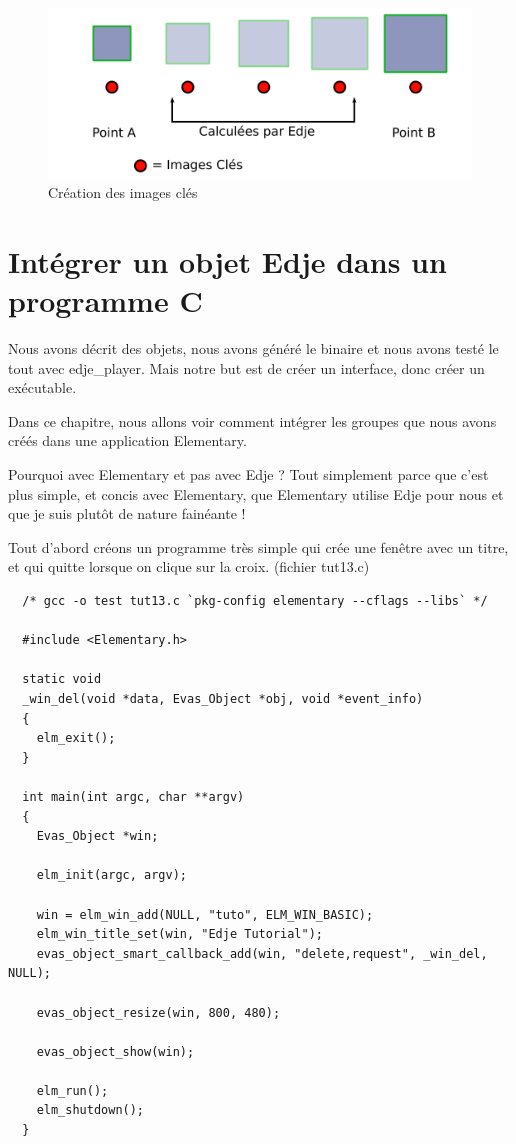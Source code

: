 \documentclass[a4paper]{efr}
\begin{document}
\begin{figure}
  \begin{center}
    \includegraphics[scale=0.5]{images/animation.pdf}
  \end{center}
  \caption{Création des images clés}
\end{figure}

\section{Intégrer un objet Edje dans un programme C}
Nous avons décrit des objets, nous avons généré le binaire et nous avons testé
le tout avec edje\_player. Mais notre but est de créer un interface, donc créer un
exécutable.

Dans ce chapitre, nous allons voir comment intégrer les groupes que nous avons
créés dans une application Elementary.

Pourquoi avec Elementary et pas avec Edje ? Tout simplement parce que c'est plus
simple, et concis avec Elementary, que Elementary utilise Edje pour nous et que
je suis plutôt de nature fainéante !

Tout d'abord créons un programme très simple qui crée une fenêtre avec un titre,
et qui quitte lorsque on clique sur la croix. (fichier tut13.c)
\begin{lstlisting}
  /* gcc -o test tut13.c `pkg-config elementary --cflags --libs` */

  #include <Elementary.h>

  static void
  _win_del(void *data, Evas_Object *obj, void *event_info)
  {
    elm_exit();
  }

  int main(int argc, char **argv)
  {
    Evas_Object *win;

    elm_init(argc, argv);

    win = elm_win_add(NULL, "tuto", ELM_WIN_BASIC);
    elm_win_title_set(win, "Edje Tutorial");
    evas_object_smart_callback_add(win, "delete,request", _win_del, NULL);

    evas_object_resize(win, 800, 480);

    evas_object_show(win);

    elm_run();
    elm_shutdown();
  }
\end{lstlisting}
\end{document}
